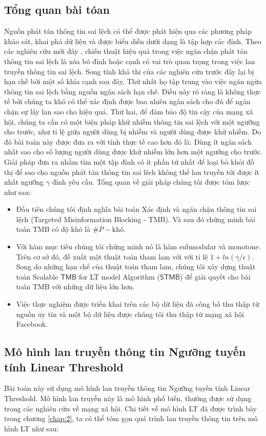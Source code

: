 \subsection{Tổng quan bài tóan}
Nguồn phát tán thông tin sai lệch có thể được phát hiện qua các phương pháp khảo sát, khai phá dữ liệu \cite{qazvin, kwon} và được biểu diễn dưới dạng là tập hợp các đỉnh. Theo các nghiên cứu mới đây \cite{khali, tong, pra}, chiến thuật hiệu quả trong việc ngăn chặn phát tán thông tin sai lệch là xóa bỏ đỉnh hoặc cạnh có vai trò quan trọng trong việc lan truyền thông tin sai lệch. Song tính khả thi của các nghiên cứu trước đây lại bị hạn chế bởi một số khía cạnh sau đây. Thứ nhất họ tập trung vào việc ngăn ngừa thông tin sai lệch bằng nguồn ngân sách hạn chế. Điều này rõ ràng là không thực tế bởi chúng ta khó có thể xác định được bao nhiêu ngân sách cho đủ để ngăn chặn sự lây lan sao cho hiệu quả. Thứ hai, để đảm bảo độ tin cậy của mạng xã hội, chúng ta cần có một biện pháp khử nhiễm thông tin sai lệch với một ngưỡng cho trước, như tỉ lệ giữa người dùng bị nhiễm và người dùng được khử nhiễm. Do đó bài toán này được đưa ra với tính thực tế cao hơn đó là: Dùng ít ngân sách nhất sao cho số lượng người dùng được khử nhiễm lớn hơn một ngưỡng cho trước. Giải pháp đưa ra nhằm tìm một tập đỉnh có ít phần tử nhất để loại bỏ khỏi đồ thị để sao cho nguồn phát tán thông tin sai lêch không thể lan truyền tới được ít nhất ngưỡng $\gamma$ đỉnh yêu cầu. Tổng quan về giải pháp chúng tôi được tóm lược như sau:
\begin{itemize}
	\item Đầu tiên chúng tôi định nghĩa bài toán Xác định và ngăn chặn thông tin sai lệch (Targeted Misinformation Blocking - TMB). Và sau đó chứng minh bài toán TMB có độ khó là $\#P-\text{khó}$.
	\item Với hàm mục tiêu chúng tôi chứng minh nó là hàm submodular và monotone. Trên cơ sở đó, đề xuất một thuật toán tham lam với với tỉ lệ $1+ln(\gamma/\epsilon)$. Song do những hạn chế của thuật toán tham lam, chúng tôi xây dựng thuật toán Scalable $\mathsf{TMB}$ for LT model Algorithm ($\mathsf{STMB}$) để giải quyết cho bài toán TMB với những dữ liệu lớn hơn. 
	\item Việc thực nghiệm được triển khai trên các bộ dữ liệu đã công bố thu thập từ nguồn uy tín và một bộ dữ liệu được chúng tôi thu thập từ mạng xã hội Facebook. 
\end{itemize}

\subsection{Mô hình lan truyền thông tin Ngưỡng tuyến tính Linear Threshold}
Bài toán này sử dụng mô hình lan truyền thông tin Ngưỡng tuyến tính Linear Threshold. Mô hình lan truyền này là mô hình phổ biến, thường được sử dụng trong các nghiên cứu về mạng xã hội. Chi tiết về mô hình LT đã được trình bày trong chương \ref{chap:2}, ta có thể tóm gọn quá trình lan truyền thông tin trên mô hình LT như sau:

